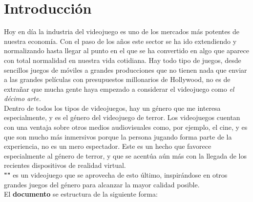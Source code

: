 \chapter{Introducción}

Hoy en día la industria del videojuego es uno de los mercados más potentes de nuestra economía. Con el paso de los años este sector se ha ido extendiendo y normalizando hasta llegar al punto en el que se ha convertido en algo que aparece con total normalidad en nuestra vida cotidiana. Hay todo tipo de juegos, desde sencillos juegos de móviles a grandes producciones que no tienen nada que enviar a las grandes películas con presupuestos millonarios de Hollywood, no es de extrañar que mucha gente haya empezado a considerar el videojuego como \textit{el décimo arte.}
\\

Dentro de todos los tipos de videojuegos, hay un género que me interesa especialmente, y es el género del videojuego de terror. Los videojuegos cuentan con una ventaja sobre otros medios audiovisuales como, por ejemplo, el cine, y es que son mucho más inmersivos porque la persona jugando forma parte de la experiencia, no es un mero espectador. Este es un hecho que favorece especialmente al género de terror, y que se acentúa aún más con la llegada de los recientes dispositivos de realidad virtual.
\\

\textbf{"\nombreJuego"} es un videojuego que se aprovecha de esto último, inspirándose en otros grandes juegos del género para alcanzar la mayor calidad posible.
\\


El \textbf{documento} se estructura de la siguiente forma:

